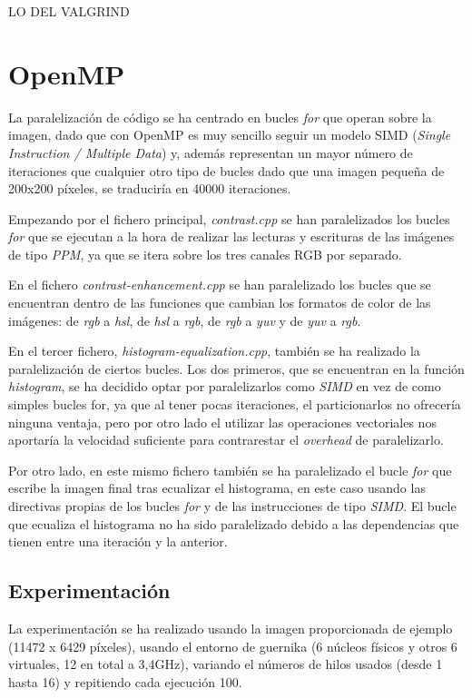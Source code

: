\documentclass[12pt]{report} %
\begin{document}
LO DEL VALGRIND

\section{OpenMP}
\label{sec:OpenMP}

La paralelización de código se ha centrado en bucles \textit{for} que operan sobre la imagen,
dado que con OpenMP es muy sencillo seguir un modelo SIMD (\textit{Single Instruction / Multiple Data})
y, además representan un mayor número de iteraciones que cualquier otro tipo de bucles dado que una
imagen pequeña de 200x200 píxeles, se traduciría en 40000 iteraciones.

Empezando por el fichero principal, \textit{contrast.cpp} se han paralelizados los bucles
\textit{for} que se ejecutan a la hora de realizar las lecturas y escrituras de las imágenes de
tipo \textit{PPM}, ya que se itera sobre los tres canales RGB por separado.

En el fichero \textit{contrast-enhancement.cpp} se han paralelizado los bucles que
se encuentran dentro de las funciones que cambian los formatos de color de las imágenes: de \textit{rgb}
a \textit{hsl}, de \textit{hsl} a \textit{rgb}, de \textit{rgb} a \textit{yuv} y de \textit{yuv}
a \textit{rgb}.

En el tercer fichero, \textit{histogram-equalization.cpp}, también se ha realizado la paralelización
de ciertos bucles. Los dos primeros, que se encuentran en la función \textit{histogram}, se ha decidido
optar por paralelizarlos como \textit{SIMD} en vez de como simples bucles for, ya que al tener pocas
iteraciones, el particionarlos no ofrecería ninguna ventaja, pero por otro lado el utilizar las operaciones
vectoriales nos aportaría la velocidad suficiente para contrarestar el \textit{overhead} de paralelizarlo.

Por otro lado, en este mismo fichero también se ha paralelizado el bucle \textit{for} que escribe la imagen
final tras ecualizar el histograma, en este caso usando las directivas propias de los bucles \textit{for} y
de las instrucciones de tipo \textit{SIMD}. El bucle que ecualiza el histograma no ha sido paralelizado
debido a las dependencias que tienen entre una iteración y la anterior.

\subsection{Experimentación}

La experimentación se ha realizado usando la imagen proporcionada de ejemplo (11472 x 6429 píxeles),
usando el entorno de guernika (6 núcleos físicos y otros 6 virtuales, 12 en total a 3,4GHz), variando
el números de hilos usados (desde 1 hasta 16) y repitiendo cada ejecución 100.
\end{document}
